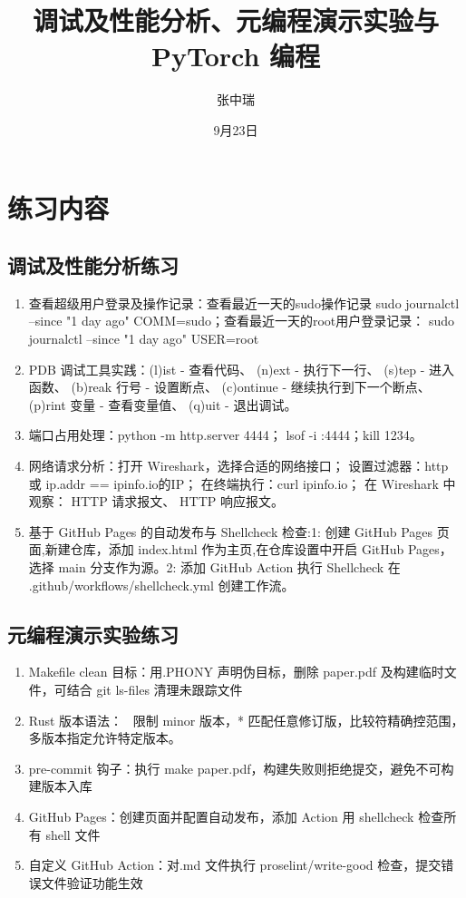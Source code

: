 \documentclass[10.5pt]{ctexart}
\title{调试及性能分析、元编程演示实验与PyTorch 编程}
\author{张中瑞}
\date{9月23日}
\begin{document}
\maketitle

\section{练习内容}
\subsection{调试及性能分析练习}
\begin{enumerate}
    \item 查看超级用户登录及操作记录：查看最近一天的sudo操作记录
sudo journalctl --since "1 day ago" COMM=sudo；查看最近一天的root用户登录记录：
sudo journalctl --since "1 day ago" USER=root
    \item PDB 调试工具实践：(l)ist - 查看代码、
(n)ext - 执行下一行、
(s)tep - 进入函数、
(b)reak 行号 - 设置断点、
(c)ontinue - 继续执行到下一个断点、
(p)rint 变量 - 查看变量值、
(q)uit - 退出调试。
    \item  端口占用处理：python -m http.server 4444；
    lsof -i :4444；kill 1234。
    \item  网络请求分析：打开 Wireshark，选择合适的网络接口；
设置过滤器：http 或 ip.addr == ipinfo.io的IP；
在终端执行：curl ipinfo.io；
在 Wireshark 中观察：
HTTP 请求报文、
HTTP 响应报文。
    \item 基于 GitHub Pages 的自动发布与 Shellcheck 检查:1: 创建 GitHub Pages 页面,新建仓库，添加 index.html 作为主页,在仓库设置中开启 GitHub Pages，选择 main 分支作为源。2: 添加 GitHub Action 执行 Shellcheck
在 .github/workflows/shellcheck.yml 创建工作流。
    \end{enumerate}
\subsection{元编程演示实验练习}
\begin{enumerate} 
    \item Makefile clean 目标：用.PHONY 声明伪目标，删除 paper.pdf 及构建临时文件，可结合 git ls-files 清理未跟踪文件
    \item Rust 版本语法：~ 限制 minor 版本，* 匹配任意修订版，比较符精确控范围，多版本指定允许特定版本。
    \item pre-commit 钩子：执行 make paper.pdf，构建失败则拒绝提交，避免不可构建版本入库
    \item GitHub Pages：创建页面并配置自动发布，添加 Action 用 shellcheck 检查所有 shell 文件
    \item 自定义 GitHub Action：对.md 文件执行 proselint/write-good 检查，提交错误文件验证功能生效
\end{enumerate}
\end{document}
